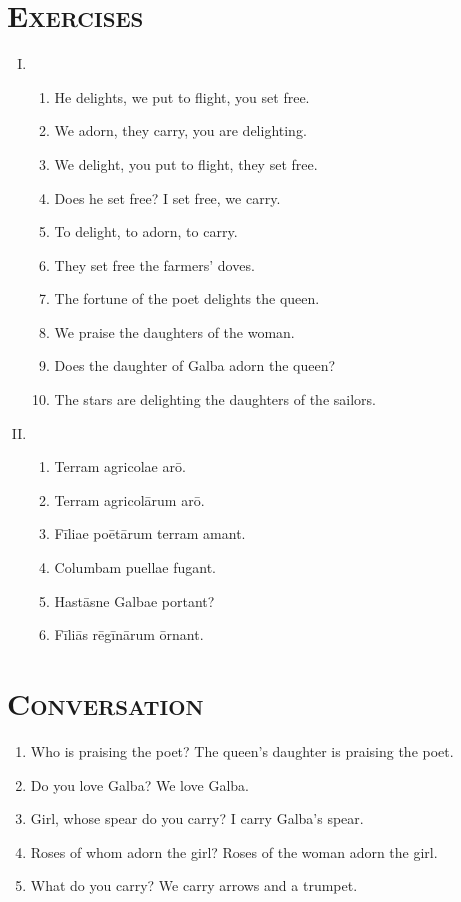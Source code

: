 \documentclass[12pt]{article}
\begin{document}
\section{\textsc{Exercises}}
\begin{enumerate}[I.]
	\setlength{\itemsep}{1em}
	\item \begin{enumerate}[1)]
		\item He delights, we put to flight, you set free.
		\item We adorn, they carry, you are delighting.
		\item We delight, you put to flight, they set free.
		\item Does he set free? I set free, we carry.
		\item To delight, to adorn, to carry.
		\item They set free the farmers' doves.
		\item The fortune of the poet delights the queen.
		\item We praise the daughters of the woman.
		\item Does the daughter of Galba adorn the queen?
		\item The stars are delighting the daughters of the sailors.
	\end{enumerate}
	\item \begin{enumerate}[1)]
		\item Terram agricolae arō.
		\item Terram agricolārum arō.
		\item Fīliae poētārum terram amant.
		\item Columbam puellae fugant.
		\item Hastāsne Galbae portant?
		\item Fīliās rēgīnārum ōrnant.
	\end{enumerate}
\end{enumerate}

\section{\textsc{Conversation}}
\begin{enumerate}[1.]
	\item Who is praising the poet? The queen's daughter is praising the poet.
	\item Do you love Galba? We love Galba.
	\item Girl, whose spear do you carry? I carry Galba's spear.
	\item Roses of whom adorn the girl? Roses of the woman adorn the girl.
	\item What do you carry? We carry arrows and a trumpet.
\end{enumerate}
\end{document}
